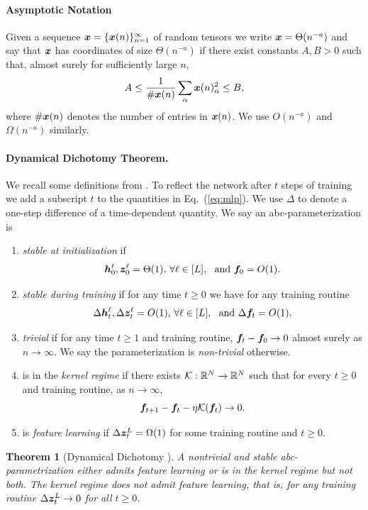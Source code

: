 \documentclass{article} %
\newtheorem{theorem}{Theorem}
\renewcommand{\citep}[1]{\cite{#1}}
\begin{document}
\paragraph{Asymptotic Notation} 
Given a sequence ${\boldsymbol x} = \{{\boldsymbol x}(n)\}_{n=1}^\infty$ of random tensors we write ${\boldsymbol x} = \Theta(n^{-a})$ and say that ${\boldsymbol x}$ has coordinates of size $\Theta(n^{-a})$ if there exist constants $A, B > 0$ such that, almost surely for sufficiently large $n$,
\[
A \leq \frac{1}{\#{\boldsymbol x}(n)} \sum_{\alpha} {\boldsymbol x}(n)_\alpha^2 \leq B,
\]
where $\#{\boldsymbol x}(n)$ denotes the number of entries in ${\boldsymbol x}(n)$. We use $O(n^{-a})$ and $\Omega(n^{-a})$ similarly.

\paragraph{Dynamical Dichotomy Theorem.} We recall some definitions from \citep{yang2023tensor}. To reflect the network after $t$ steps of training we add a subscript $t$ to the quantities in Eq.\ (\ref{eq:mlp}). We use $\Delta$ to denote a one-step difference of a time-dependent quantity. We say an abc-parameterization is
\begin{enumerate}
    \item \textit{stable at initialization} if 
    \[
        {\boldsymbol h}_0^\ell, {\boldsymbol z}_0^\ell = \Theta(1),\, \forall \ell \in [L],~~\text{and } {\boldsymbol f}_0 = O(1).
    \]

    \item \textit{stable during training} if for any time $t \geq 0$ we have for any training routine
    \[
        \Delta {\boldsymbol h}_t^\ell, \Delta {\boldsymbol z}_t^\ell = O(1),\, \forall \ell \in [L],~~\text{and } \Delta {\boldsymbol f}_t = O(1).
    \]

    \item \textit{trivial} if for any time $t \geq 1$ and training routine, ${\boldsymbol f}_t - {\boldsymbol f}_0 \to 0$ almost surely as $n \to \infty$. We say the parameterization is \textit{non-trivial} otherwise.

    \item is in the \textit{kernel regime} if there exists ${\mathcal K} : \mathbb{R}^N \to \mathbb{R}^N$ such that for every $t \geq 0$ and training routine, as $n \to \infty$,
    \[
        {\boldsymbol f}_{t+1} - {\boldsymbol f}_t - \eta {\mathcal K}({\boldsymbol f}_t) \to 0.
    \]

    \item is \textit{feature learning} if $\Delta {\boldsymbol z}_t^L = \Omega(1)$ for some training routine and $t \geq 0$.
\end{enumerate}
\begin{theorem}[Dynamical Dichotomy \citep{yang2021tensor}]\label{thm:dynamical_dichotomy}
A nontrivial and stable abc-parametrization
either admits feature learning or is in the kernel regime  but not both. The kernel regime does not admit feature learning, that is, for any training routine $\Delta {\boldsymbol z}_t^L \to 0$ for all $t \geq 0$.
\end{theorem}
\end{document}
